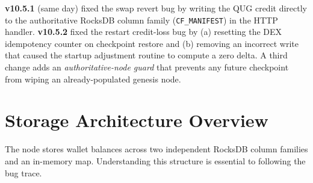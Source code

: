 \documentclass[11pt,a4paper]{article}
\begin{document}
\medskip

\begin{fixbox}[Resolution]
\textbf{v10.5.1} (same day) fixed the swap revert bug by writing the QUG credit
directly to the authoritative RocksDB column family (\texttt{CF\_MANIFEST}) in
the HTTP handler.  \textbf{v10.5.2} fixed the restart credit-loss bug by (a)
resetting the DEX idempotency counter on checkpoint restore and (b) removing an
incorrect write that caused the startup adjustment routine to compute a zero
delta.  A third change adds an \emph{authoritative-node guard} that prevents
any future checkpoint from wiping an already-populated genesis node.
\end{fixbox}

\section{Storage Architecture Overview}

The node stores wallet balances across two independent RocksDB column families
and an in-memory map.  Understanding this structure is essential to following
the bug trace.
\end{document}
